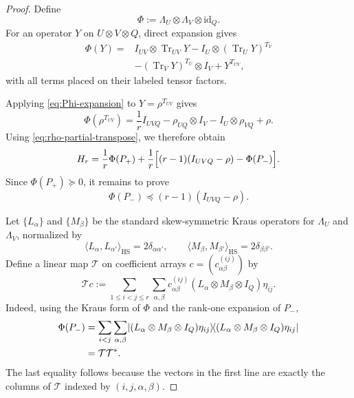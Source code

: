 \documentclass[11pt,reqno]{amsart}
\theoremstyle{remark}
\DeclareMathOperator{\Tr}{Tr}
\newcommand{\id}{\mathrm{id}}
\newcommand{\ketbra}[2]{\lvert #1\rangle\!\langle #2\rvert}
\begin{document}
\begin{proof}
Define
\[
    \Phi
    :=
    \Lambda_U\otimes\Lambda_V\otimes\id_Q.
\]
For an operator $Y$ on $U\otimes V\otimes Q$, direct expansion gives
\begin{equation}
\label{eq:Phi-expansion}
\begin{aligned}
    \Phi(Y)
    ={}&
    I_{UV}\otimes\Tr_{UV}Y
    -I_U\otimes(\Tr_UY)^{T_V}\\
    &-(\Tr_VY)^{T_U}\otimes I_V
    +Y^{T_{UV}},
\end{aligned}
\end{equation}
with all terms placed on their labeled tensor factors.

Applying \cref{eq:Phi-expansion} to
$Y=\rho^{T_{UV}}$ gives
\begin{equation}
\label{eq:Phi-rhoT}
    \Phi(\rho^{T_{UV}})
    =
    \frac1r I_{UVQ}
    -\rho_{UQ}\otimes I_V
    -I_U\otimes\rho_{VQ}
    +\rho.
\end{equation}
Using \cref{eq:rho-partial-transpose}, we therefore obtain
\begin{equation}
\label{eq:H-decomposition}
    H_r
    =
    \frac1r\Phi(P_+)
    +
    \frac1r
    \Bigl[
      (r-1)(I_{UVQ}-\rho)-\Phi(P_-)
    \Bigr].
\end{equation}
Since $\Phi(P_+)\succeq0$, it remains to prove
\begin{equation}
\label{eq:Phi-Pminus-goal}
    \Phi(P_-)
    \preceq
    (r-1)(I_{UVQ}-\rho).
\end{equation}

Let $\{L_\alpha\}$ and $\{M_\beta\}$ be the standard skew-symmetric
Kraus operators for $\Lambda_U$ and $\Lambda_V$, normalized by
\[
    \langle L_\alpha,L_{\alpha'}\rangle_{\mathrm{HS}}
    =
    2\delta_{\alpha\alpha'},
    \qquad
    \langle M_\beta,M_{\beta'}\rangle_{\mathrm{HS}}
    =
    2\delta_{\beta\beta'}.
\]
Define a linear map $\mathcal T$ on coefficient arrays
$c=(c_{\alpha\beta}^{(ij)})$ by
\begin{equation}
\label{eq:T-definition}
    \mathcal Tc
    :=
    \sum_{1\le i<j\le r}
    \sum_{\alpha,\beta}
    c_{\alpha\beta}^{(ij)}
    (L_\alpha\otimes M_\beta\otimes I_Q)\eta_{ij}.
\end{equation}
Indeed, using the Kraus form of $\Phi$ and the rank-one expansion of
$P_-$,
\begin{align}
    \Phi(P_-)
    &=
    \sum_{i<j}\sum_{\alpha,\beta}
    \ketbra{
      (L_\alpha\otimes M_\beta\otimes I_Q)\eta_{ij}}
      {(L_\alpha\otimes M_\beta\otimes I_Q)\eta_{ij}}
    \notag\\
    &=\mathcal T\mathcal T^*.
\label{eq:Phi-Pminus-TTstar}
\end{align}
The last equality follows because the vectors in the first line are
exactly the columns of $\mathcal T$ indexed by
$(i,j,\alpha,\beta)$.


\end{proof}
\end{document}
